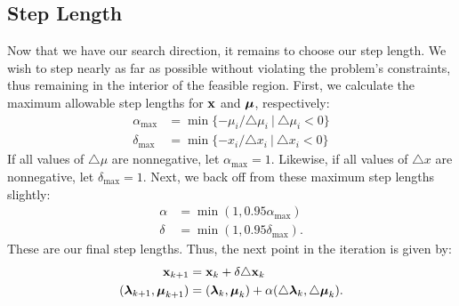  %

\subsection*{Step Length}

Now that we have our search direction, it remains to choose our step length.
We wish to step nearly as far as possible without violating the problem's constraints, thus remaining in the interior of the feasible region.
First, we calculate the maximum allowable step lengths for $\mathbf{x}$ and $\boldsymbol{\mu}$, respectively:
\begin{align*}
\alpha_{\max} &= \min\{-\mu_i/\triangle \mu_i\ |\ \triangle \mu_i < 0 \}\\
\delta_{\max} &= \min\{-x_i/\triangle x_i\ |\ \triangle x_i < 0\}
\end{align*}
If all values of $\triangle\mu$ are nonnegative, let $\alpha_{\max}=1$.
Likewise, if all values of $\triangle x$ are nonnegative, let $\delta_{\max}=1$.
Next, we back off from these maximum step lengths slightly:
\begin{align*}
\alpha &= \min(1, 0.95\alpha_{\max})\\
\delta &= \min(1, 0.95\delta_{\max}).
\end{align*}
These are our final step lengths.
Thus, the next point in the iteration is given by:
\begin{align*}
\mathbf{x}_{k+1} &= \mathbf{x}_k + \delta \triangle \mathbf{x}_k\\
(\boldsymbol{\lambda}_{k+1}, \boldsymbol{\mu}_{k+1}) &= (\boldsymbol{\lambda}_k, \boldsymbol{\mu}_k) + \alpha(\triangle \boldsymbol{\lambda}_k, \triangle \boldsymbol{\mu}_k).
\end{align*}

